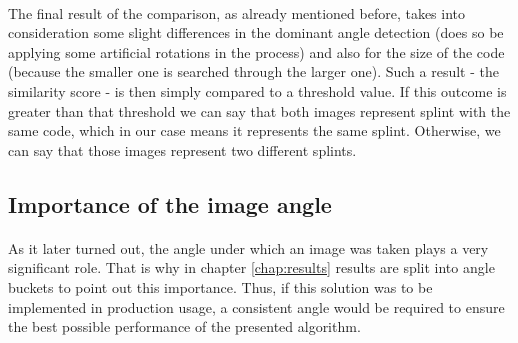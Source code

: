 \newpage
\paragraph{}
The final result of the comparison, as already mentioned before, takes into consideration some slight differences in the dominant angle detection (does so be applying some artificial rotations in the process) and also for the size of the code (because the smaller one is searched through the larger one). Such a result - the similarity score - is then simply compared to a threshold value. If this outcome is greater than that threshold we can say that both images represent splint with the same code, which in our case means it represents the same splint. Otherwise, we can say that those images represent two different splints.

\subsection{Importance of the image angle} \label{subsect:angle_importance}
\paragraph{}
As it later turned out, the angle under which an image was taken plays a very significant role. That is why in chapter \autoref{chap:results} results are split into angle buckets to point out this importance. Thus, if this solution was to be implemented in production usage, a consistent angle would be required to ensure the best possible performance of the presented algorithm.










